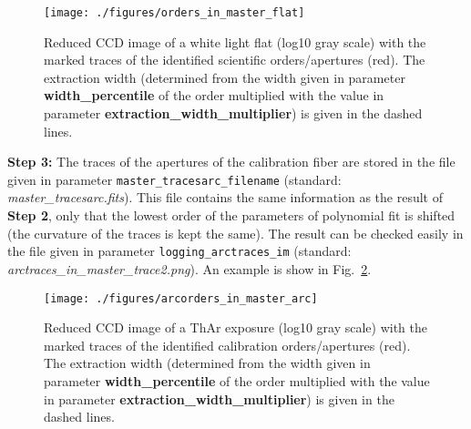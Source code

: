 \documentclass[10pt,a4paper]{article}
\begin{document}
\begin{figure} 
  \begin{center}
    \texttt{[image: ./figures/orders\_in\_master\_flat]}
  \end{center} 
  \caption{Reduced CCD image of a white light flat (log10 gray scale) with the marked traces of the identified scientific orders/apertures (red). The extraction width (determined from the width given in parameter \textbf{width\_percentile} of the order multiplied with the value in parameter \textbf{extraction\_width\_multiplier}) is given in the dashed lines.
    \label{figure_apertures_in_master_flat}}
\end{figure}


\vspace{0.5em}\noindent \textbf{Step 3:} The traces of the apertures of the calibration fiber are stored in the file given in parameter \verb|master_tracesarc_filename| (standard: \textit{master\_tracesarc.fits}). This file contains the same information as the result of \textbf{Step 2}, only that the lowest order of the parameters of polynomial fit is shifted (the curvature of the traces is kept the same). The result can be checked easily in the file given in parameter \verb|logging_arctraces_im| (standard: \textit{arctraces\_in\_master\_trace2.png}). An example is show in Fig.~\ref{figure_arcapertures_in_master_arc}.

\begin{figure} 
  \begin{center}
    \texttt{[image: ./figures/arcorders\_in\_master\_arc]}
  \end{center} 
  \caption{Reduced CCD image of a ThAr exposure (log10 gray scale) with the marked traces of the identified calibration orders/apertures (red). The extraction width (determined from the width given in parameter \textbf{width\_percentile} of the order multiplied with the value in parameter \textbf{extraction\_width\_multiplier}) is given in the dashed lines.
    \label{figure_arcapertures_in_master_arc}}
\end{figure}
\end{document}
